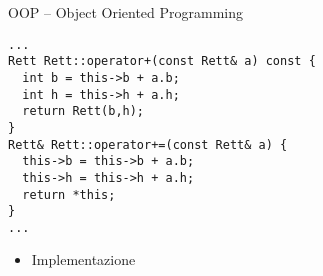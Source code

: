 \begin{frame}[fragile]{OOP -- Object Oriented Programming}
  \vfill
  \begin{lstlisting}[firstnumber=49]
...
Rett Rett::operator+(const Rett& a) const {
  int b = this->b + a.b;
  int h = this->h + a.h;
  return Rett(b,h);
}
Rett& Rett::operator+=(const Rett& a) {
  this->b = this->b + a.b;
  this->h = this->h + a.h;
  return *this;
}
...\end{lstlisting}
  \vfill
  \begin{itemize}
    \item Implementazione
  \end{itemize}
  \vfill
\end{frame}
